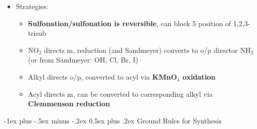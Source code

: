 \documentclass[10pt,landscape]{article}
\makeatletter
\renewcommand{\section}{\@startsection{section}{1}{0mm}%
  {-1ex plus -.5ex minus -.2ex}%
  {0.5ex plus .2ex}%
  {\normalfont\large\bfseries}}
\makeatother
\begin{document}
\begin{multicols*}{3}
\begin{scriptsize}
\begin{itemize}
\begin{itemize}
      \end{itemize}
    \item Strategies:
      \begin{itemize}
      \item \textbf{Sulfonation/sulfonation is reversible}, can block 5 position of 1,2,3-trisub
      \item NO$_2$ directs m, reduction (and Sandmeyer) converts to o/p director NH$_2$
        (or from Sandmeyer: OH, Cl, Br, I)
      \item Alkyl directs o/p, converted to acyl via \textbf{KMnO$_4$ oxidation }
      \item Acyl directs m, can be converted to corresponding alkyl via \textbf{Clemmenson
          reduction}
      \end{itemize}
    \end{itemize}

    \section{Ground Rules for Synthesis}


\end{scriptsize}
\end{multicols*}
\end{document}
